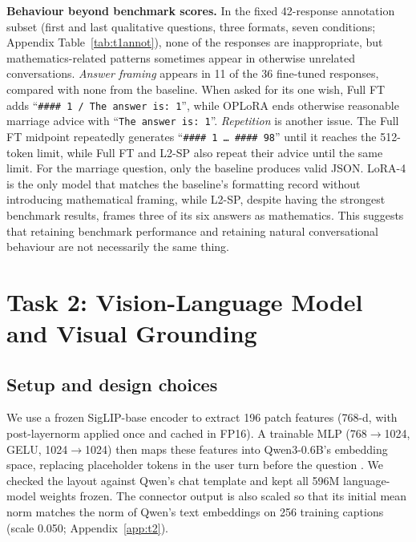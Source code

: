 \documentclass{article}
\begin{document}
\textbf{Behaviour beyond benchmark scores.} In the fixed 42-response annotation subset (first and last qualitative questions, three formats, seven conditions; Appendix Table~\ref{tab:t1annot}), none of the responses are inappropriate, but mathematics-related patterns sometimes appear in otherwise unrelated conversations. \emph{Answer framing} appears in 11 of the 36 fine-tuned responses, compared with none from the baseline. When asked for its one wish, Full FT adds ``\texttt{\#\#\#\# 1 / The answer is: 1}'', while OPLoRA ends otherwise reasonable marriage advice with ``\texttt{The answer is: 1}''. \emph{Repetition} is another issue. The Full FT midpoint repeatedly generates ``\texttt{\#\#\#\# 1 \dots\ \#\#\#\# 98}'' until it reaches the 512-token limit, while Full FT and L2-SP also repeat their advice until the same limit. For the marriage question, only the baseline produces valid JSON. LoRA-4 is the only model that matches the baseline's formatting record without introducing mathematical framing, while L2-SP, despite having the strongest benchmark results, frames three of its six answers as mathematics. This suggests that retaining benchmark performance and retaining natural conversational behaviour are not necessarily the same thing.

\section{Task 2: Vision-Language Model and Visual Grounding}
\label{sec:task2}

\subsection{Setup and design choices}

We use a frozen SigLIP-base encoder \citep{siglip} to extract 196 patch features (768-d, with post-layernorm applied once and cached in FP16). A trainable MLP (768$\to$1024, GELU, 1024$\to$1024) then maps these features into Qwen3-0.6B's embedding space, replacing placeholder tokens in the user turn before the question \citep{llava}. We checked the layout against Qwen's chat template and kept all 596M language-model weights frozen. The connector output is also scaled so that its initial mean norm matches the norm of Qwen's text embeddings on 256 training captions (scale 0.050; Appendix~\ref{app:t2}).
\end{document}
